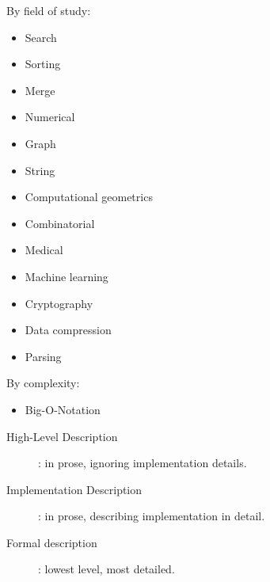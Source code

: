 By field of study:
\begin{itemize}
  \item Search
  \item Sorting
  \item Merge
  \item Numerical
  \item Graph
  \item String
  \item Computational geometrics
  \item Combinatorial
  \item Medical
  \item Machine learning
  \item Cryptography
  \item Data compression
  \item Parsing
\end{itemize}

By complexity:
\begin{itemize}
  \item Big-O-Notation
\end{itemize}

\begin{description}
  \item [High-Level Description]: in prose, ignoring implementation details.
  \item [Implementation Description]: in prose, describing implementation in detail.
  \item [Formal description]: lowest level, most detailed.
\end{description}

 \\
 \\
 \\
 \\
 \\
 \\
 \\
 \\
 \\
 



